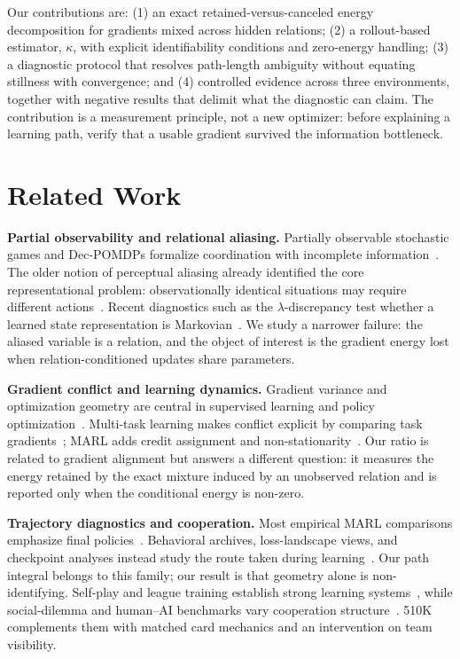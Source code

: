 \documentclass[letterpaper]{article}
\begin{document}
Our contributions are:
(1) an exact retained-versus-canceled energy decomposition for gradients mixed across hidden relations;
(2) a rollout-based estimator, $\kappa$, with explicit identifiability conditions and zero-energy handling;
(3) a diagnostic protocol that resolves path-length ambiguity without equating stillness with convergence; and
(4) controlled evidence across three environments, together with negative results that delimit what the diagnostic can claim.
The contribution is a measurement principle, not a new optimizer: before explaining a learning path, verify that a usable gradient survived the information bottleneck.


\section{Related Work}

\textbf{Partial observability and relational aliasing.}
Partially observable stochastic games and Dec-POMDPs formalize coordination with incomplete information~\cite{oliehoek2016concise,lowe2017multiagent,foerster2018counterfactual}.
The older notion of perceptual aliasing already identified the core representational problem: observationally identical situations may require different actions~\cite{chrisman1992perceptual}.
Recent diagnostics such as the $\lambda$-discrepancy test whether a learned state representation is Markovian~\cite{allen2024lambda}.
We study a narrower failure: the aliased variable is a relation, and the object of interest is the gradient energy lost when relation-conditioned updates share parameters.

\textbf{Gradient conflict and learning dynamics.}
Gradient variance and optimization geometry are central in supervised learning and policy optimization~\cite{bottou2018optimization,schulman2015trust,schulman2017proximal}.
Multi-task learning makes conflict explicit by comparing task gradients~\cite{yu2020gradient,zeng2021decentralized}; MARL adds credit assignment and non-stationarity~\cite{foerster2018counterfactual,hernandez2019emergent}.
Our ratio is related to gradient alignment but answers a different question: it measures the energy retained by the exact mixture induced by an unobserved relation and is reported only when the conditional energy is non-zero.

\textbf{Trajectory diagnostics and cooperation.}
Most empirical MARL comparisons emphasize final policies~\cite{papoudakis2019comparative}.
Behavioral archives, loss-landscape views, and checkpoint analyses instead study the route taken during learning~\cite{ecoffet2021first,li2018visualizing,lu2022discovered}.
Our path integral belongs to this family; our result is that geometry alone is non-identifying.
Self-play and league training establish strong learning systems~\cite{tesauro1995temporal,silver2016mastering,vinyals2019grandmaster,lanctot2017unified}, while social-dilemma and human--AI benchmarks vary cooperation structure~\cite{leibo2017multiagent,carroll2019utility}.
510K complements them with matched card mechanics and an intervention on team visibility.
\end{document}
